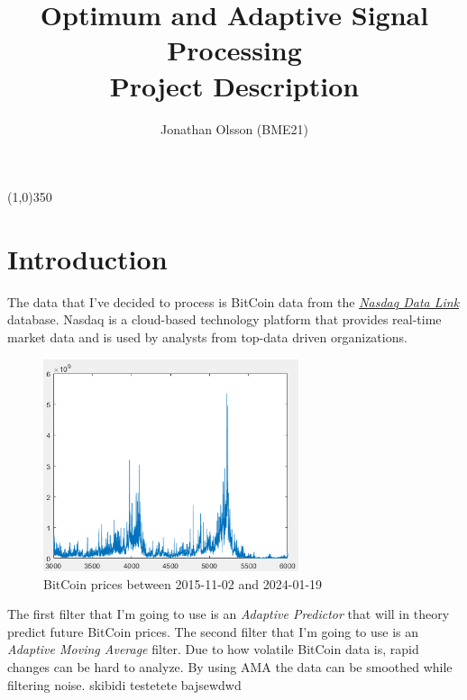 \documentclass[twoside,twocolumn,9pt,a4paper]{IEEEtran}
\begin{document}
\onecolumn

\title{Optimum and Adaptive Signal Processing \\
\large Project Description}
\author{Jonathan Olsson (BME21)}
\maketitle
\begin{center}
\line(1,0){350}
\end{center}
\IEEEaftertitletext{\vspace{-1\baselineskip}}

\section{Introduction} \label{secIntroduction}
The data that I've decided to process is BitCoin data from the \href{https://www.nasdaq.com/nasdaq-data-link}{\textit{Nasdaq Data Link}} database.
Nasdaq is a cloud-based technology platform that provides real-time market data and is used by analysts from top-data driven organizations.

\begin{figure}[h]
\begin{center}
\includegraphics[width=7.5cm]{Images/bitcoin.png} %
\caption{BitCoin prices between 2015-11-02 and 2024-01-19}
\label{DimensionMicrochip}
\end{center}
\end{figure} %

The first filter that I'm going to use is an \textit{Adaptive Predictor} that will in theory predict future BitCoin prices. The second filter that I'm going to use is an \textit{Adaptive Moving Average} filter. Due to how volatile BitCoin data is, rapid changes can be
hard to analyze. By using AMA the data can be smoothed while filtering noise. skibidi testetete bajsewdwd
\end{document}
